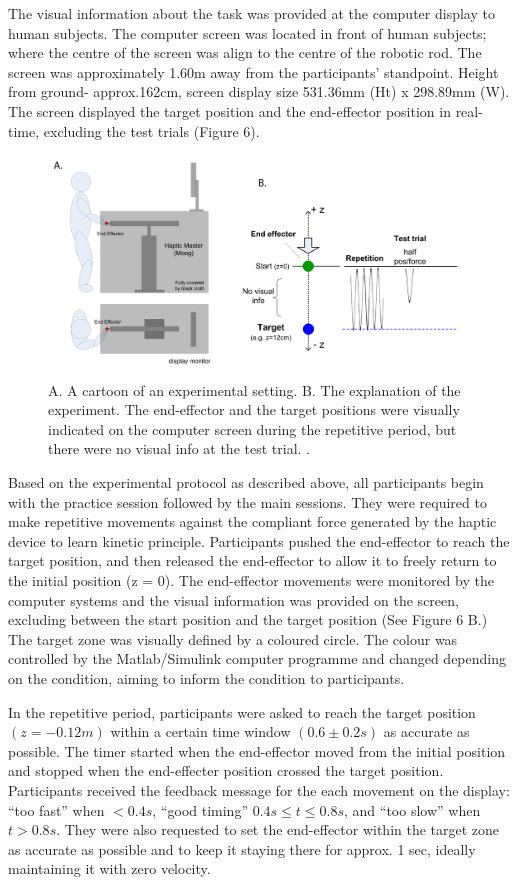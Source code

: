The visual information about the task was provided at the computer display to human subjects.
The computer screen was located in front of human subjects; where the centre of the screen was align to the centre of the robotic rod. The screen was approximately 1.60m away from the participants’ standpoint. Height from ground- approx.162cm, screen display size 531.36mm (Ht) x 298.89mm (W). The screen displayed the target position and the end-effector position in real-time, excluding the test trials (Figure 6). 
%
\begin{figure}
  \centering
  \includegraphics[scale=0.5]{Chie/figs/Figure6.png}
  \caption{A. A cartoon of an experimental setting. B. The explanation of the experiment. The end-effector and the target positions were visually indicated on the computer screen during the repetitive period, but there were no visual info at the test trial. .}
  \label{settingHM}
\end{figure}

Based on the experimental protocol as described above, all participants begin with the practice session followed by the main sessions. They were required to make repetitive movements against the compliant force generated by the haptic device to learn kinetic principle. Participants pushed the end-effector to reach the target position, and then released the end-effector to allow it to freely return to the initial position (z = 0). The end-effector movements were monitored by the computer systems and the visual information was provided on the screen, excluding between the start position and the target position (See Figure 6 B.) The target zone was visually defined by a coloured circle. The colour was controlled by the Matlab/Simulink computer programme and changed depending on the condition, aiming to inform the condition to participants. 

In the repetitive period, participants were asked to reach the target position$ (z = -0.12 m)$ within a certain time window $(0.6\pm 0.2s)$ as accurate as possible. The timer started when the end-effector moved from the initial position and stopped when the end-effecter position crossed the target position.  Participants received the feedback message for the each movement on the display:  “too fast” when $< 0.4 s$, “good timing” $0.4s \leq t \leq 0.8 s$, and “too slow” when $t > 0.8 s$. They were also requested to set the end-effector within the target zone as accurate as possible and to keep it staying there for approx. 1 sec, ideally maintaining it with zero velocity.

